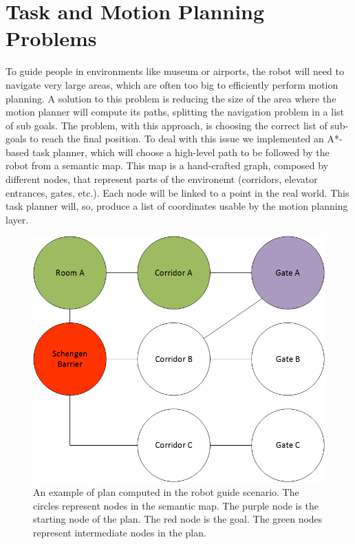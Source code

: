 \section{Task and Motion Planning Problems}
\label{sec:spencer-planning}
To guide people in environments like museum or airports, the robot will need to navigate very large areas, which are often too big to efficiently perform motion planning. A solution to this problem is reducing the size of the area where the motion planner will compute its paths, splitting the navigation problem in a list of sub goals. The problem, with this approach,  is choosing the correct list of sub-goals to reach the final position.  To deal with this issue we implemented an A*-based task planner, which will choose a high-level path to be followed by the robot from a semantic map. This map is a hand-crafted graph, composed by different nodes, that represent parts of the environemt (corridors, elevator entrances, gates, etc.). Each node will be linked to a point in the real world. This task planner will, so, produce a list of coordinates usable by the motion planning layer. 

\begin{figure}[ht!]
	\centering
	\includegraphics[scale=0.45]{img/case_study/spencer/ShengenTaskPlanner.png}
	\caption[Robot Guide Plan]{An example of plan computed in the robot guide scenario. The circles represent nodes in the semantic map. The purple node is the starting node of the plan. The red node is the goal. The green nodes represent intermediate nodes in the plan.}
	\label{fig:spencer-semantic_plan}
\end{figure}


